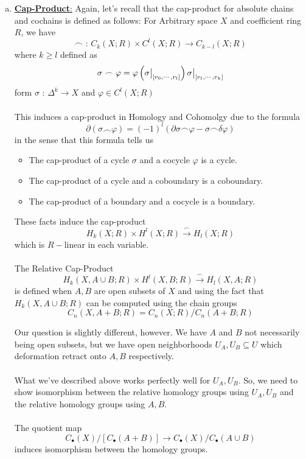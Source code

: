 \documentclass[11pt]{article}
\begin{document}
\begin{enumerate}[(a)]
  \item \underline{\textbf{Cap-Product}:} Again, let's recall that the cap-product for absolute chains and cochains is defined as follows: For Arbitrary space $X$ and coefficient ring $R$, we have $$\frown \text{ : } C_{k}(X; R) \times C^l(X; R) \rightarrow C_{k-l}(X; R)$$ where $k \geq l$ defined as $$ \sigma \frown \varphi = \varphi \left( \restr{\sigma}{[v_0, \cdots, v_l]} \right) \restr{\sigma}{[v_{l}, \cdots, v_k]} $$ form $\sigma \text{ : } \Delta^{k} \rightarrow X$ and $\varphi \in C^l(X; R)$ 
  \\
  \\
  This induces a cap-product in Homology and Cohomolgy due to the formula $$\partial\left( \sigma \frown \varphi \right) = (-1)^l \left( \partial\sigma \frown \varphi - \sigma \frown \delta \varphi \right) $$ in the sense that this formula tells us 
  \begin{itemize}
    \item The cap-product of a cycle $\sigma$ and a cocycle $\varphi$ is a cycle. 
    \item The cap-product of a cycle and a coboundary is a coboundary.
    \item The cap-product of a boundary and a cocycle is a boundary.
  \end{itemize}
  These facts induce the cap-product $$ H_k(X; R) \times H^l(X; R) \xrightarrow{\frown} H_l(X; R) $$ which is $R-$linear in each variable.
  \\
  \\
  The Relative Cap-Product $$ H_k(X, A \cup B; R) \times H^l(X, B; R) \xrightarrow{\frown} H_{l}(X, A; R) $$ is defined when $A, B$ are open subsets of $X$ and using the fact that $H_k(X, A \cup B; R)$ can be computed using the chain groups 
  $$ C_n(X, A+B; R) = C_n(X; R)/C_n(A+B; R) $$

  Our question is slightly different, however. We have $A$ and $B$ not necessarily being open subsets, but we have open neighborhoods $U_A, U_B \subseteq U$ which deformation retract onto $A, B$ respectively.
  \\
  \\
  What we've described above works perfectly well for $U_A, U_B$. So, we need to show isomorphism between the relative homology groups using $U_A, U_B$ and the relative homology groups using $A, B$.
  \\
  \\
  The quotient map $$ C_{\bullet}(X)/[C_{\bullet}(A + B)] \rightarrow C_{\bullet}(X)/C_{\bullet}(A \cup B) $$ induces isomorphism between the homology groups. 
\end{enumerate}
\end{document}
